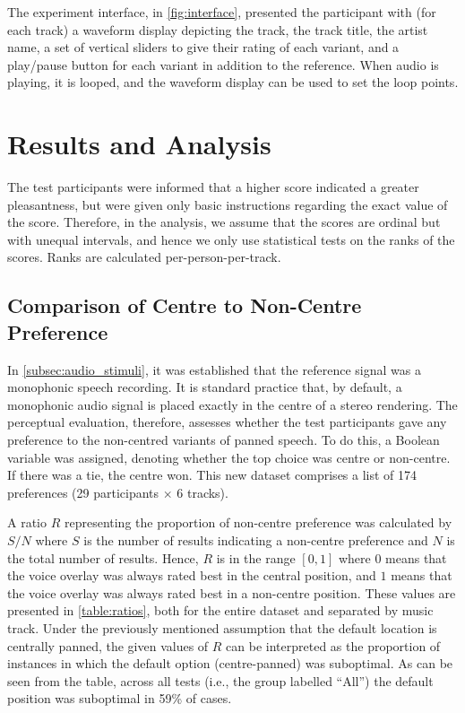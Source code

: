 \documentclass[fleqn]{jaes}
\begin{document}
The experiment interface, in \cref{fig:interface}, presented the participant with (for each track) a waveform display depicting the track, the track title, the artist name, a set of vertical sliders to give their rating of each variant, and a play/pause button for each variant in addition to the reference. When audio is playing, it is looped, and the waveform display can be used to set the loop points.


\section{Results and Analysis}
\label{sec:results_analysis}

The test participants were informed that a higher score indicated a greater pleasantness, but were given only basic instructions regarding the exact value of the score. Therefore, in the analysis, we assume that the scores are ordinal but with unequal intervals, and hence we only use statistical tests on the ranks of the scores. Ranks are calculated per-person-per-track. 

\subsection{Comparison of Centre to Non-Centre Preference}
\label{sec:noncentrepref}

In \cref{subsec:audio_stimuli}, it was established that the reference signal was a monophonic speech recording. It is standard practice that, by default, a monophonic audio signal is placed exactly in the centre of a stereo rendering. The perceptual evaluation, therefore, assesses whether the test participants gave any preference to the non-centred variants of panned speech. To do this, a Boolean variable was assigned, denoting whether the top choice was centre or non-centre. If there was a tie, the centre won. This new dataset comprises a list of 174 preferences (29 participants $\times$ 6 tracks).

A ratio $R$ representing the proportion of non-centre preference was calculated by $S/N$ where $S$ is the number of results indicating a non-centre preference and $N$ is the total number of results. Hence, $R$ is in the range $[0,1]$ where $0$ means that the voice overlay was always rated best in the central position, and $1$ means that the voice overlay was always rated best in a non-centre position. These values are presented in \cref{table:ratios}, both for the entire dataset and separated by music track. Under the previously mentioned assumption that the default location is centrally panned, the given values of $R$ can be interpreted as the proportion of instances in which the default option (centre-panned) was suboptimal. As can be seen from the table, across all tests (i.e., the group labelled \enquote{All}) the default position was suboptimal in 59\% of cases.
\end{document}
